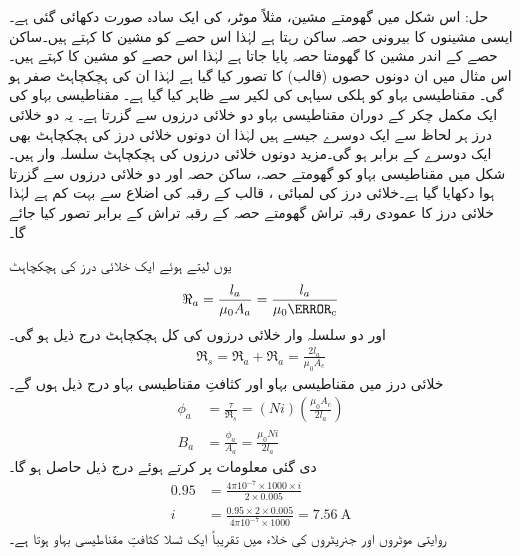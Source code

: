 حل:\quad
اس شکل میں گھومتے مشین، مثلاً موٹر، کی ایک سادہ صورت دکھائی گئی ہے۔ ایسی مشینوں کا بیرونی حصہ ساکن رہتا ہے لہٰذا اس حصے  کو مشین کا  کہتے ہیں۔ساکن حصے کے اندر مشین کا  گھومتا حصہ پایا جاتا ہے لہٰذا اس حصے کو مشین کا  کہتے ہیں۔ اس مثال میں ان دونوں  حصوں (قالب) کا    تصور کیا گیا ہے لہٰذا ان کی ہچکچاہٹ صفر ہو گی۔ مقناطیسی بہاو  کو ہلکی سیاہی کی لکیر سے ظاہر کیا گیا ہے۔ مقناطیسی بہاو کی ایک مکمل چکر کے دوران مقناطیسی بہاو دو خلائی درزوں  سے گزرتا ہے۔ یہ دو خلائی درز ہر لحاظ سے ایک دوسرے  جیسے ہیں لہٰذا ان دونوں خلائی درز کی ہچکچاہٹ بھی ایک دوسرے کے برابر ہو گی۔مزید دونوں خلائی درزوں کی ہچکچاہٹ سلسلہ وار ہیں۔شکل  میں مقناطیسی بہاو کو گھومتے حصہ، ساکن حصہ اور دو خلائی درزوں  سے گزرتا ہوا دکھایا گیا ہے۔خلائی درز کی لمبائی ، قالب کے رقبہ  کی اضلاع سے بہت کم ہے لہٰذا خلائی درز کا عمودی رقبہ تراش   گھومتے حصہ کے رقبہ تراش  کے برابر تصور کیا جائے گا۔

یوں  لیتے ہوئے ایک خلائی درز کی ہچکچاہٹ
\begin{align*}
\Re_a=\frac{l_a}{\mu_0 A_a}=\frac{l_a}{\mu_0 \A_c}
\end{align*}
اور دو سلسلہ وار خلائی درزوں کی کل ہچکچاہٹ درج ذیل ہو گی۔
\begin{align*}
\Re_s=\Re_a+\Re_a=\frac{2 l_a}{\mu_0 A_c}
\end{align*}
خلائی درز میں مقناطیسی بہاو  اور کثافتِ مقناطیسی بہاو  درج ذیل ہوں گے۔
\begin{align*}
\phi_a&=\frac{\tau}{\Re_s}=\left(N i \right) \left (\frac{\mu_0 A_c}{2 l_a} \right)\\
B_a&=\frac{\phi_a}{A_a}=\frac{\mu_0 N i}{2 l_a}
\end{align*}
دی گئی معلومات پر کرتے ہوئے درج ذیل حاصل ہو گا۔
\begin{align*}
0.95&=\frac{4 \pi 10^{-7} \times 1000 \times i}{2 \times 0.005}\\
i&=\frac{0.95 \times 2 \times 0.005}{ 4 \pi 10^{-7} \times 1000}=\SI{7.56}{\ampere}
\end{align*}
روایتی موٹروں اور جنریٹروں کی خلاء میں تقریباً ایک ٹسلا کثافتِ مقناطیسی بہاو ہوتا ہے۔


